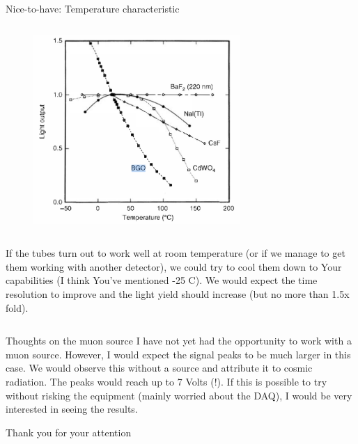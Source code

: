 \begin{columnframe}{Nice-to-have: Temperature characteristic}
    \begin{column}{0.5\textwidth}
        \begin{figure}
            \centering
            \includegraphics[width=0.7\textwidth]{images/BGO_and_others_light_temp.png}
        \end{figure}
    \end{column}
    \begin{column}{0.5\textwidth}
        If the tubes turn out to work well at room temperature (or if we manage to get them working with another detector), we could try to cool them down to Your capabilities (I think You've mentioned -25 C). We would expect the time resolution to improve and the light yield should increase (but no more than 1.5x fold).
    \end{column}
\end{columnframe}

\begin{frame}{Thoughts on the muon source}
    I have not yet had the opportunity to work with a muon source. However, I would expect the signal peaks to be much larger in this case. We would observe this without a source and attribute it to cosmic radiation. The peaks would reach up to 7 Volts (!). If this is possible to try without risking the equipment (mainly worried about the DAQ), I would be very interested in seeing the results.

\end{frame}




\begin{frame}{}
    \centering
    \Large{Thank you for your attention}
\end{frame}


